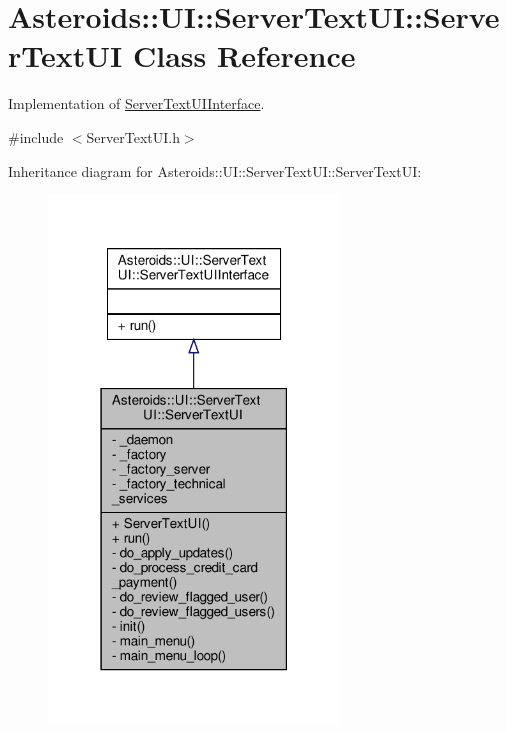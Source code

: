 \hypertarget{classAsteroids_1_1UI_1_1ServerTextUI_1_1ServerTextUI}{}\section{Asteroids\+:\+:UI\+:\+:Server\+Text\+UI\+:\+:Server\+Text\+UI Class Reference}
\label{classAsteroids_1_1UI_1_1ServerTextUI_1_1ServerTextUI}


Implementation of \hyperlink{classAsteroids_1_1UI_1_1ServerTextUI_1_1ServerTextUIInterface}{Server\+Text\+U\+I\+Interface}.  




{\ttfamily \#include $<$Server\+Text\+U\+I.\+h$>$}



Inheritance diagram for Asteroids\+:\+:UI\+:\+:Server\+Text\+UI\+:\+:Server\+Text\+UI\+:\nopagebreak
\begin{figure}[H]
\begin{center}
\leavevmode
\includegraphics[width=219pt]{classAsteroids_1_1UI_1_1ServerTextUI_1_1ServerTextUI__inherit__graph}
\end{center}
\end{figure}


